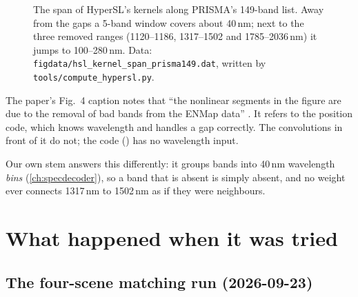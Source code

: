 \begin{figure}[htbp]
\centering
{}
\caption[The span of HyperSL's kernels along PRISMA's 149-band list]{The span of HyperSL's kernels along PRISMA's
149-band list. Away from the gaps a 5-band window covers about
40\,nm; next to the three removed ranges (1120--1186, 1317--1502 and 1785--2036\,nm) it jumps to 100--280\,nm. Data: \texttt{figdata/\allowbreak hsl\_kernel\_span\_prisma149.dat}, written by
\texttt{tools/\allowbreak compute\_hypersl.py}.}
\label{fig:hslnorm:span}
\end{figure}

\begin{sourcenote}
The paper's Fig.~4 caption notes that ``the nonlinear segments in the figure are due to the removal of bad bands from
the ENMap data'' \citep{kong2025hypersl}. It refers to the position code, which knows wavelength and handles a gap
correctly. The convolutions in front of it do not; the code ()
has no wavelength input.
\end{sourcenote}

Our own stem answers this differently: it groups bands into 40\,nm wavelength \emph{bins} (\cref{ch:specdecoder}), so a
band that is absent is simply absent, and no weight ever connects 1317\,nm to 1502\,nm as if they were neighbours.

\section{What happened when it was tried}\label{sec:hslnorm:measured}

\subsection{The four-scene matching run (2026-09-23)}

